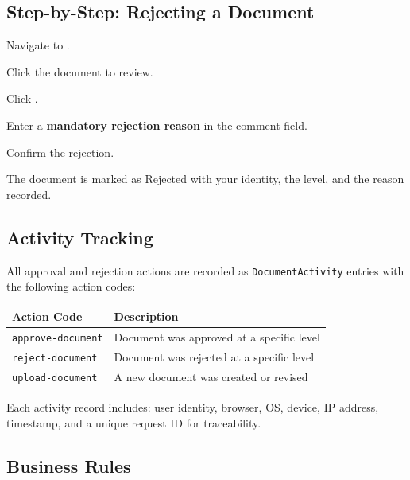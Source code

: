 \subsection{Step-by-Step: Rejecting a Document}

\begin{ugSteps}
  \item Navigate to .
  \item Click the document to review.
  \item Click .
  \item Enter a \textbf{mandatory rejection reason} in the
        comment field.
  \item Confirm the rejection.
  \item The document is marked as Rejected with your identity,
        the level, and the reason recorded.
\end{ugSteps}

\subsection{Activity Tracking}

All approval and rejection actions are recorded as
\texttt{DocumentActivity} entries with the following action
codes:

\begin{tabularx}{\textwidth}{@{} l X @{}}
  \toprule
  \textbf{Action Code} & \textbf{Description} \\
  \midrule
  \texttt{approve-document}
    & Document was approved at a specific level \\
  \texttt{reject-document}
    & Document was rejected at a specific level \\
  \texttt{upload-document}
    & A new document was created or revised \\
  \bottomrule
\end{tabularx}

Each activity record includes: user identity, browser, OS,
device, IP address, timestamp, and a unique request ID for
traceability.

\subsection{Business Rules}

